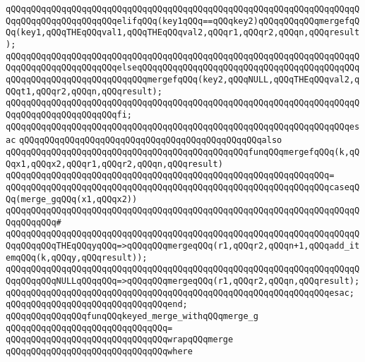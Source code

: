 \verb|qQQqqQQqqQQqqQQqqQQqqQQqqQQqqQQqqQQqqQQqqQQqqQQqqQQqqQQqqQQqqQQqqQQqqQQqqQQqqQQqqQQqqQQqqQQqelifqQQq(key1qQQq==qQQqkey2)qQQqqQQqqQQqmergefqQQq(key1,qQQqTHEqQQqval1,qQQqTHEqQQqval2,qQQqr1,qQQqr2,qQQqn,qQQqresult);|\newline
\verb|qQQqqQQqqQQqqQQqqQQqqQQqqQQqqQQqqQQqqQQqqQQqqQQqqQQqqQQqqQQqqQQqqQQqqQQqqQQqqQQqqQQqqQQqqQQqelseqQQqqQQqqQQqqQQqqQQqqQQqqQQqqQQqqQQqqQQqqQQqqQQqqQQqqQQqqQQqqQQqqQQqqQQqmergefqQQq(key2,qQQqNULL,qQQqTHEqQQqval2,qQQqt1,qQQqr2,qQQqn,qQQqresult);|\newline
\verb|qQQqqQQqqQQqqQQqqQQqqQQqqQQqqQQqqQQqqQQqqQQqqQQqqQQqqQQqqQQqqQQqqQQqqQQqqQQqqQQqqQQqqQQqqQQqfi;|\newline
\verb|qQQqqQQqqQQqqQQqqQQqqQQqqQQqqQQqqQQqqQQqqQQqqQQqqQQqqQQqqQQqqQQqqQQqesac|\newline
\newline
\verb|qQQqqQQqqQQqqQQqqQQqqQQqqQQqqQQqqQQqqQQqqQQqqQQqalso|\newline
\verb|qQQqqQQqqQQqqQQqqQQqqQQqqQQqqQQqqQQqqQQqqQQqqQQqfunqQQqmergefqQQq(k,qQQqx1,qQQqx2,qQQqr1,qQQqr2,qQQqn,qQQqresult)|\newline
\verb|qQQqqQQqqQQqqQQqqQQqqQQqqQQqqQQqqQQqqQQqqQQqqQQqqQQqqQQqqQQqqQQq=|\newline
\verb|qQQqqQQqqQQqqQQqqQQqqQQqqQQqqQQqqQQqqQQqqQQqqQQqqQQqqQQqqQQqqQQqcaseqQQq(merge_gqQQq(x1,qQQqx2))|\newline
\verb|qQQqqQQqqQQqqQQqqQQqqQQqqQQqqQQqqQQqqQQqqQQqqQQqqQQqqQQqqQQqqQQqqQQqqQQqqQQqqQQq#|\newline
\verb|qQQqqQQqqQQqqQQqqQQqqQQqqQQqqQQqqQQqqQQqqQQqqQQqqQQqqQQqqQQqqQQqqQQqqQQqqQQqqQQqTHEqQQqyqQQq=>qQQqqQQqmergeqQQq(r1,qQQqr2,qQQqn+1,qQQqadd_itemqQQq(k,qQQqy,qQQqresult));|\newline
\verb|qQQqqQQqqQQqqQQqqQQqqQQqqQQqqQQqqQQqqQQqqQQqqQQqqQQqqQQqqQQqqQQqqQQqqQQqqQQqqQQqNULLqQQqqQQq=>qQQqqQQqmergeqQQq(r1,qQQqr2,qQQqn,qQQqresult);|\newline
\verb|qQQqqQQqqQQqqQQqqQQqqQQqqQQqqQQqqQQqqQQqqQQqqQQqqQQqqQQqqQQqqQQqesac;|\newline
\verb|qQQqqQQqqQQqqQQqqQQqqQQqqQQqqQQqend;|\newline
\newline
\verb|qQQqqQQqqQQqqQQqfunqQQqkeyed_merge_withqQQqmerge_g|\newline
\verb|qQQqqQQqqQQqqQQqqQQqqQQqqQQqqQQq=|\newline
\verb|qQQqqQQqqQQqqQQqqQQqqQQqqQQqqQQqwrapqQQqmerge|\newline
\verb|qQQqqQQqqQQqqQQqqQQqqQQqqQQqqQQqwhere|\newline
